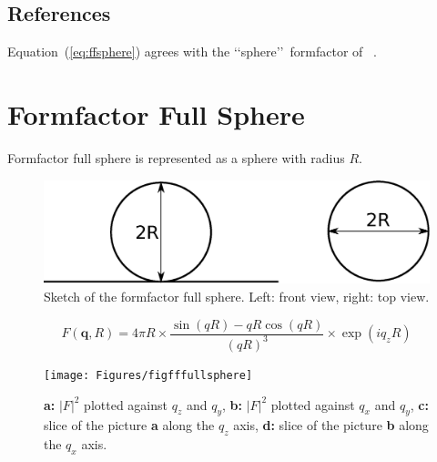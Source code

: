 \subsection{References}
Equation~(\ref{eq:ffsphere}) agrees with the \lq\lq sphere\rq\rq ~formfactor of \IsGISAXS~\cite{Laz02}.

\newpage{\cleardoublepage}


\section{Formfactor Full Sphere}
Formfactor full sphere is represented as a sphere with radius $R$. 
\begin{figure}[ht]
\begin{center}
\includegraphics[width=0.6\columnwidth]{Figures/fullsphere}
\caption{Sketch of the formfactor full sphere. Left: front view, right: top view.}
\end{center}
\label{fullsphere}
\end{figure}

\begin{equation}
F(\mathbf q, R) = 4\pi R\times\frac{\sin(qR)-qR\cos(qR)}{(qR)^3}\times\exp\left(iq_zR\right)
\end{equation}

\begin{figure}[h]
\begin{center}
\texttt{[image: Figures/figfffullsphere]}
\end{center}
\caption{{\bf a:} $|F|^2$ plotted against $q_z$ and $q_y$, {\bf b:} $|F|^2$ plotted against $q_x$ and $q_y$, {\bf c:} slice of the picture {\bf a} along the $q_z$ axis, {\bf d:} slice of the picture {\bf b} along the $q_x$ axis.}
\end{figure}

\par

